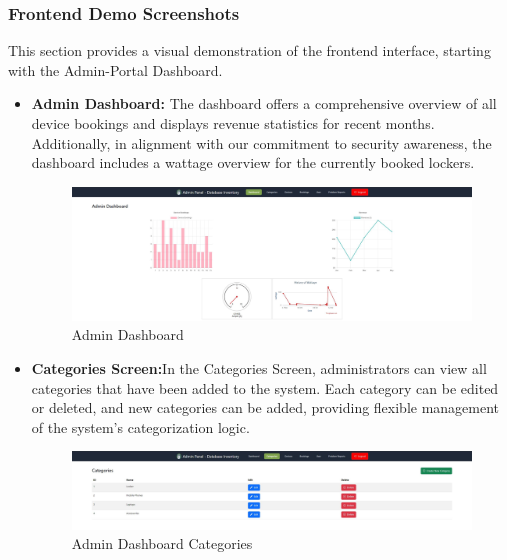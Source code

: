 \subsubsection{Frontend Demo Screenshots}
This section provides a visual demonstration of the frontend interface, starting with the Admin-Portal Dashboard. 
\begin{itemize}
\item \textbf {Admin Dashboard:} The dashboard offers a comprehensive overview of all device bookings and displays revenue statistics for recent months. Additionally, in alignment with our commitment to security awareness, the dashboard includes a wattage overview for the currently booked lockers.
\begin{figure}[h]
    \centering
    \includegraphics[width=1\linewidth]{images/admin-dashboard.JPG}
    \caption{Admin Dashboard}
    \label{fig:admin-dashboard}
\end{figure}

\item \textbf {Categories Screen:}In the Categories Screen, administrators can view all categories that have been added to the system. Each category can be edited or deleted, and new categories can be added, providing flexible management of the system's categorization logic.
\begin{figure}[h]
    \centering
    \includegraphics[width=1\linewidth]{images/categories.JPG}
    \caption{Admin Dashboard Categories}
    \label{fig:categories-dashboard}
\end{figure}



\end{itemize}

